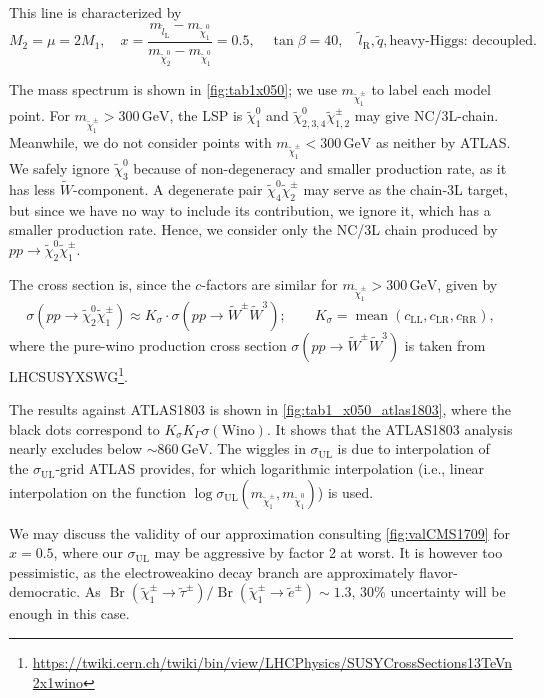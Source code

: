 \documentclass[a4paper,10pt,captions=tableheading,DIV=14]{scrartcl}
\numberwithin{equation}{section}
\newcommand\w[1]{_{\mathrm{#1}}}
\DeclareMathOperator{\Br}{\mathrm{Br}}
\newcommand\unit[1]{\,\mathrm{#1}\xspace}
\newcommand\GeV{\unit{GeV}}
\newcommand\neut  [1][\relax]{{\tilde\chi^0_{#1}}}
\newcommand\charPM[1][\relax]{{\tilde\chi^\pm_{#1}}}
\begin{document}
This line is characterized by
\begin{equation}
 M_2=\mu=2M_1,
\quad
 x = \frac{m_{\tilde l\w L}-m_{\neut[1]}}{m_{\neut[2]}-m_{\neut[1]}}=0.5,
\quad
 \tan\beta=40,
\quad
 \tilde l\w R, \tilde q, \text{heavy-Higgs: decoupled}.
\end{equation}

The mass spectrum is shown in \cref{fig:tab1x050}; we use $m_{\charPM[1]}$ to label each model point.
For $m_{\charPM[1]}>300\GeV$, the LSP is $\neut[1]$ and $\neut[2,3,4]\charPM[1,2]$ may give NC/3L-chain.
Meanwhile, we do not consider points with $m_{\charPM[1]}<300\GeV$ as neither by ATLAS.
We safely ignore $\neut[3]$ because of non-degeneracy and smaller production rate, as it has less $\tilde W$-component.
A degenerate pair $\neut[4]\charPM[2]$ may serve as the chain-3L target, but since we have no way to include its contribution, we ignore it, which has a smaller production rate.
Hence, we consider only the NC/3L chain produced by $pp\to\neut[2]\charPM[1]$.

The cross section is, since the $c$-factors are similar for $m_{\charPM[1]}>300\GeV$, given by
\begin{equation}
 \sigma(pp\to\neut[2]\charPM[1])\approx K_{\sigma}\cdot \sigma(pp\to\tilde W^\pm\tilde W^3);
\qquad
 K_\sigma = \mathop{\mathrm{mean}}(c\w{LL},c\w{LR},c\w{RR}),
\end{equation}
where the pure-wino production cross section $\sigma(pp\to\tilde W^\pm\tilde W^3)$ is taken from LHCSUSYXSWG\footnote{\url{https://twiki.cern.ch/twiki/bin/view/LHCPhysics/SUSYCrossSections13TeVn2x1wino}}.

The results against ATLAS1803 is shown in \cref{fig:tab1_x050_atlas1803}, where the black dots correspond to $K_\sigma K_\Gamma \sigma(\text{Wino})$.
It shows that the ATLAS1803 analysis nearly excludes below $\sim860\GeV$.
The wiggles in $\sigma\w{UL}$ is due to interpolation of the $\sigma\w{UL}$-grid ATLAS provides, for which logarithmic interpolation (i.e., linear interpolation on the function $\log\sigma\w{UL}(m_{\charPM[1]},m_{\neut[1]})$) is used.

We may discuss the validity of our approximation consulting \cref{fig:valCMS1709} for $x=0.5$, where our $\sigma\w{UL}$ may be aggressive by factor 2 at worst.
It is however too pessimistic, as the electroweakino decay branch are approximately flavor-democratic. As $\Br(\charPM[1]\to\tilde\tau^\pm) / \Br(\charPM[1]\to\tilde e^\pm) \sim 1.3$, 30\% uncertainty will be enough in this case.
\end{document}
